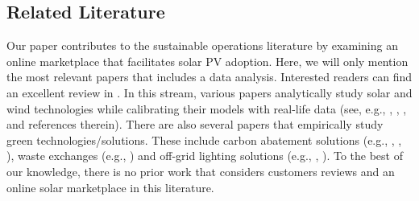 \documentclass[mnsc,blindrev]{informs3}
\begin{document}
	
\subsection{Related Literature} \label{Sec: Lit}
	
	Our paper contributes to the sustainable operations literature by examining an online marketplace that facilitates solar PV adoption. Here, we will only mention the most relevant papers that includes a data analysis. Interested readers can find an excellent review in \cite{HLee}. In this stream, various papers analytically study solar and wind technologies while calibrating their models with real-life data (see, e.g., \cite{alanwolf}, \cite{NJ}, \cite{SunarandBirge}, and references therein). There are also several papers that empirically study green technologies/solutions. These include carbon abatement solutions (e.g., \cite{blanco2020carbon},  \cite{huang2020carrot}, \cite{Corbett2}), waste exchanges (e.g., \cite{Suvrat}) and  off-grid lighting solutions (e.g., \cite{uppari}, \cite{Kamalini2019}).
	To the best of our knowledge, there is no prior work that considers customers reviews and an online solar marketplace in this literature.
	
	
	
	
\end{document}
